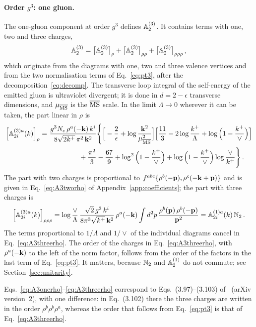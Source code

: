 \paragraph{Order $g^3$: one gluon.} The one-gluon component at order $g^3$ defines $\mathbb{A}^{(3)}_2$. It contains terms with one, two and three charges,
\begin{align}
\mathbb{A}^{(3)}_2=\big[\mathbb{A}^{(3)}_2\big]_\rho+\big[\mathbb{A}^{(3)}_2\big]_{\rho\rho}+\big[\mathbb{A}^{(3)}_2\big]_{\rho\rho\rho}\,,
\end{align}
which originate from the diagrams with one, two and three valence vertices and from the two normalisation terms of Eq.~\eqref{eq:pt3}, after the decomposition~\eqref{eq:decomp}. The transverse loop integral of the self-energy of the emitted gluon is ultraviolet divergent; it is done in $d=2-\epsilon$ transverse dimensions, and $\mu_{\overline{\rm MS}}$ is the $\overline{\rm MS}$ scale. In the limit $\Lambda\to0$ wherever it can be taken, the part linear in $\rho$ is
\begin{align}\label{eq:A3onerho}
\Big[\mathbb{A}^{(3)a}_{2i}(k)\Big]_{\rho}=\ &\frac{g^3N_c\,\rho^a(-\mathbf{k})\,k^i}{8\sqrt{2k^+}\,\pi^2\,\mathbf{k}^2}\Bigg\{\Big[-\frac2\epsilon+\log\frac{\mathbf{k}^2}{\mu^2_{\overline{\rm MS}}}\Big]
\Big[\frac{11}{3}-2\log\frac{k^+}{\Lambda}+\log\Big(1-\frac{k^+}{\vee}\Big)\Big]
\notag\\&\hspace{1.5cm}
+\frac{\pi^2}{3}-\frac{67}{9}+\log^2\Big(1-\frac{k^+}{\vee}\Big)+\log\Big(1-\frac{k^+}{\vee}\Big)\log\frac{\vee}{k^+}\Bigg\}\,.
\end{align}
The part with two charges is proportional to $f^{abc}\{\rho^b(-\mathbf{p}),\rho^c(-\mathbf{k}+\mathbf{p})\}$ and is given in Eq.~\eqref{eq:A3tworho} of Appendix~\ref{app:coefficients}; the part with three charges is
\begin{align}\label{eq:A3threerho}
\Big[\mathbb{A}^{(3)a}_{2i}(k)\Big]_{\rho\rho\rho}=\log\frac{\vee}{\Lambda}\,\frac{\sqrt2\,g^3\,k^i}{8\pi^3\sqrt{k^+}\,\mathbf{k}^2}\,\rho^a(-\mathbf{k})\int d^2p\,\frac{\rho^b(\mathbf{p})\,\rho^b(-\mathbf{p})}{\mathbf{p}^2}
=\mathbb{A}^{(1)a}_{2i}(k)\,\mathbb{N}_2\,.
\end{align}
The terms proportional to $1/\Lambda$ and $1/\vee$ of the individual diagrams cancel in Eq.~\eqref{eq:A3threerho}. The order of the charges in Eq.~\eqref{eq:A3threerho}, with $\rho^a(-\mathbf{k})$ to the left of the norm factor, follows from the order of the factors in the last term of Eq.~\eqref{eq:pt3}. It matters, because $\mathbb{N}_2$ and $\mathbb{A}^{(1)}_2$ do not commute; see Section~\ref{sec:unitarity}.

Eqs.~\eqref{eq:A3onerho}--\eqref{eq:A3threerho} correspond to Eqs.~(3.97)--(3.103) of~\cite{Lublinsky:2016meo} (arXiv version~2), with one difference: in Eq.~(3.102) there the three charges are written in the order $\rho^b\rho^b\rho^a$, whereas the order that follows from Eq.~\eqref{eq:pt3} is that of Eq.~\eqref{eq:A3threerho}.


